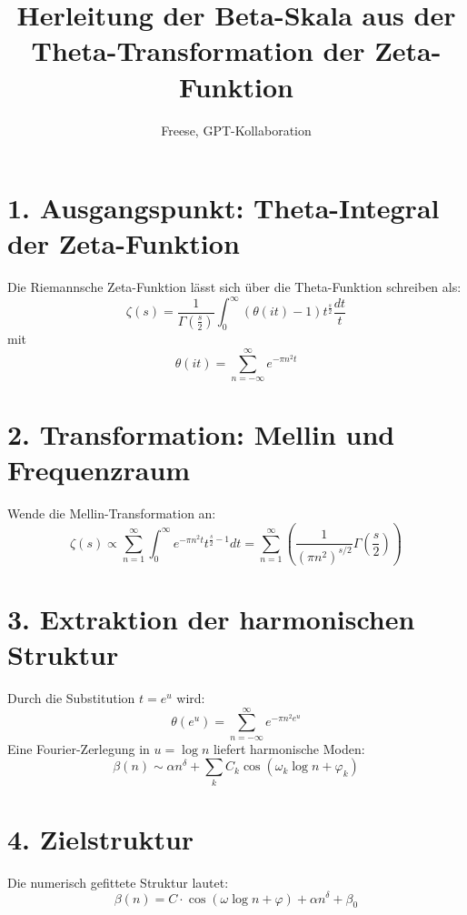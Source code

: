 \documentclass{article}
\title{Herleitung der Beta-Skala aus der Theta-Transformation der Zeta-Funktion}
\author{Freese, GPT-Kollaboration}
\date{}
\begin{document}
\maketitle

\section*{1. Ausgangspunkt: Theta-Integral der Zeta-Funktion}

Die Riemannsche Zeta-Funktion lässt sich über die Theta-Funktion schreiben als:
\[
\zeta(s) = \frac{1}{\Gamma\left(\frac{s}{2}\right)} \int_0^\infty \left( \theta(it) - 1 \right) t^{\frac{s}{2}} \frac{dt}{t}
\]
mit
\[
\theta(it) = \sum_{n=-\infty}^{\infty} e^{-\pi n^2 t}
\]

\section*{2. Transformation: Mellin und Frequenzraum}
Wende die Mellin-Transformation an:
\[
\zeta(s) \propto \sum_{n=1}^{\infty} \int_0^\infty e^{-\pi n^2 t} t^{\frac{s}{2} - 1} dt
= \sum_{n=1}^{\infty} \left( \frac{1}{(\pi n^2)^{s/2}} \Gamma\left( \frac{s}{2} \right) \right)
\]

\section*{3. Extraktion der harmonischen Struktur}

Durch die Substitution $t = e^u$ wird:
\[
\theta(e^u) = \sum_{n=-\infty}^{\infty} e^{-\pi n^2 e^u}
\]
Eine Fourier-Zerlegung in $u = \log n$ liefert harmonische Moden:
\[
\beta(n) \sim \alpha n^\delta + \sum_k C_k \cos(\omega_k \log n + \varphi_k)
\]

\section*{4. Zielstruktur}

Die numerisch gefittete Struktur lautet:
\[
\beta(n) = C \cdot \cos(\omega \log n + \varphi) + \alpha n^\delta + \beta_0
\]
\end{document}
